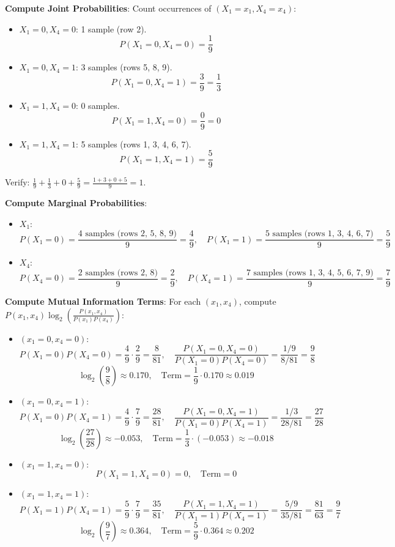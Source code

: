 \documentclass[a3paper,12pt]{extarticle} %
\begin{document}
\begin{enumerate}
\textbf{Compute Joint Probabilities}: Count occurrences of \((X_1 = x_1, X_4 = x_4)\):
\begin{itemize}
    \item \(X_1 = 0, X_4 = 0\): 1 sample (row 2).
    \[
    P(X_1 = 0, X_4 = 0) = \frac{1}{9}
    \]
    \item \(X_1 = 0, X_4 = 1\): 3 samples (rows 5, 8, 9).
    \[
    P(X_1 = 0, X_4 = 1) = \frac{3}{9} = \frac{1}{3}
    \]
    \item \(X_1 = 1, X_4 = 0\): 0 samples.
    \[
    P(X_1 = 1, X_4 = 0) = \frac{0}{9} = 0
    \]
    \item \(X_1 = 1, X_4 = 1\): 5 samples (rows 1, 3, 4, 6, 7).
    \[
    P(X_1 = 1, X_4 = 1) = \frac{5}{9}
    \]
\end{itemize}
Verify: \(\frac{1}{9} + \frac{1}{3} + 0 + \frac{5}{9} = \frac{1 + 3 + 0 + 5}{9} = 1\).

\textbf{Compute Marginal Probabilities}:
\begin{itemize}
    \item \(X_1\):
    \[
    P(X_1 = 0) = \frac{\text{4 samples (rows 2, 5, 8, 9)}}{9} = \frac{4}{9}, \quad P(X_1 = 1) = \frac{\text{5 samples (rows 1, 3, 4, 6, 7)}}{9} = \frac{5}{9}
    \]
    \item \(X_4\):
    \[
    P(X_4 = 0) = \frac{\text{2 samples (rows 2, 8)}}{9} = \frac{2}{9}, \quad P(X_4 = 1) = \frac{\text{7 samples (rows 1, 3, 4, 5, 6, 7, 9)}}{9} = \frac{7}{9}
    \]
\end{itemize}

\textbf{Compute Mutual Information Terms}:
For each \((x_1, x_4)\), compute \(P(x_1, x_4) \log_2 \left( \frac{P(x_1, x_4)}{P(x_1)P(x_4)} \right)\):
\begin{itemize}
    \item \((x_1 = 0, x_4 = 0)\):
    \[
    P(X_1 = 0)P(X_4 = 0) = \frac{4}{9} \cdot \frac{2}{9} = \frac{8}{81}, \quad \frac{P(X_1 = 0, X_4 = 0)}{P(X_1 = 0)P(X_4 = 0)} = \frac{1/9}{8/81} = \frac{9}{8}
    \]
    \[
    \log_2 \left( \frac{9}{8} \right) \approx 0.170, \quad \text{Term} = \frac{1}{9} \cdot 0.170 \approx 0.019
    \]
    \item \((x_1 = 0, x_4 = 1)\):
    \[
    P(X_1 = 0)P(X_4 = 1) = \frac{4}{9} \cdot \frac{7}{9} = \frac{28}{81}, \quad \frac{P(X_1 = 0, X_4 = 1)}{P(X_1 = 0)P(X_4 = 1)} = \frac{1/3}{28/81} = \frac{27}{28}
    \]
    \[
    \log_2 \left( \frac{27}{28} \right) \approx -0.053, \quad \text{Term} = \frac{1}{3} \cdot (-0.053) \approx -0.018
    \]
    \item \((x_1 = 1, x_4 = 0)\):
    \[
    P(X_1 = 1, X_4 = 0) = 0, \quad \text{Term} = 0
    \]
    \item \((x_1 = 1, x_4 = 1)\):
    \[
    P(X_1 = 1)P(X_4 = 1) = \frac{5}{9} \cdot \frac{7}{9} = \frac{35}{81}, \quad \frac{P(X_1 = 1, X_4 = 1)}{P(X_1 = 1)P(X_4 = 1)} = \frac{5/9}{35/81} = \frac{81}{63} = \frac{9}{7}
    \]
    \[
    \log_2 \left( \frac{9}{7} \right) \approx 0.364, \quad \text{Term} = \frac{5}{9} \cdot 0.364 \approx 0.202
    \]
\end{itemize}


\end{enumerate}
\end{document}

